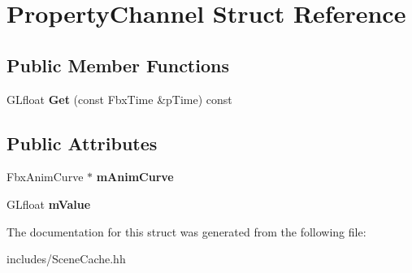 \hypertarget{struct_property_channel}{\section{Property\-Channel Struct Reference}
\label{struct_property_channel}
}
\subsection*{Public Member Functions}
\begin{DoxyCompactItemize}
\item 
\hypertarget{struct_property_channel_a8c5b9055c524e6781501405737cf4782}{G\-Lfloat {\bfseries Get} (const Fbx\-Time \&p\-Time) const }\label{struct_property_channel_a8c5b9055c524e6781501405737cf4782}

\end{DoxyCompactItemize}
\subsection*{Public Attributes}
\begin{DoxyCompactItemize}
\item 
\hypertarget{struct_property_channel_a2cdb65a9f9ace8380622e4a60f0fb835}{Fbx\-Anim\-Curve $\ast$ {\bfseries m\-Anim\-Curve}}\label{struct_property_channel_a2cdb65a9f9ace8380622e4a60f0fb835}

\item 
\hypertarget{struct_property_channel_af0146f683c4f9246f0ca414aeb7e8ce3}{G\-Lfloat {\bfseries m\-Value}}\label{struct_property_channel_af0146f683c4f9246f0ca414aeb7e8ce3}

\end{DoxyCompactItemize}


The documentation for this struct was generated from the following file\-:\begin{DoxyCompactItemize}
\item 
includes/Scene\-Cache.\-hh\end{DoxyCompactItemize}
